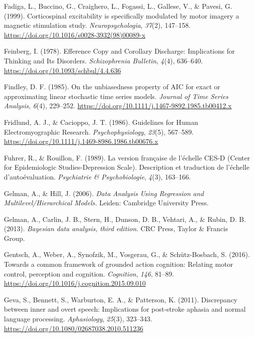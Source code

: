 \documentclass[a4paper,12pt,twoside,openright,oldfontcommands]{memoir}
\begin{document}
\hypertarget{ref-fadiga_corticospinal_1999}{}
Fadiga, L., Buccino, G., Craighero, L., Fogassi, L., Gallese, V., \&
Pavesi, G. (1999). Corticospinal excitability is specifically modulated
by motor imagery a magnetic stimulation study. \emph{Neuropsychologia},
\emph{37}(2), 147--158.
\url{https://doi.org/10.1016/s0028-3932(98)00089-x}

\hypertarget{ref-feinberg_efference_1978}{}
Feinberg, I. (1978). Efference Copy and Corollary Discharge:
Implications for Thinking and Its Disorders. \emph{Schizophrenia
Bulletin}, \emph{4}(4), 636--640.
\url{https://doi.org/10.1093/schbul/4.4.636}

\hypertarget{ref-findley_unbiasedness_1985}{}
Findley, D. F. (1985). On the unbiasedness property of AIC for exact or
approximating linear stochastic time series models. \emph{Journal of
Time Series Analysis}, \emph{6}(4), 229--252.
\url{https://doi.org/10.1111/j.1467-9892.1985.tb00412.x}

\hypertarget{ref-fridlund_guidelines_1986}{}
Fridlund, A. J., \& Cacioppo, J. T. (1986). Guidelines for Human
Electromyographic Research. \emph{Psychophysiology}, \emph{23}(5),
567--589. \url{https://doi.org/10.1111/j.1469-8986.1986.tb00676.x}

\hypertarget{ref-fuhrer_version_1989}{}
Fuhrer, R., \& Rouillon, F. (1989). La version française de l'échelle
CES-D (Center for Epidemiologic Studies-Depression Scale). Description
et traduction de l'échelle d'autoévaluation. \emph{Psychiatrie \&
Psychobiologie}, \emph{4}(3), 163--166.

\hypertarget{ref-gelman_data_2006}{}
Gelman, A., \& Hill, J. (2006). \emph{Data Analysis Using Regression and
Multilevel/Hierarchical Models.} Leiden: Cambridge University Press.

\hypertarget{ref-gelman_bayesian_2013}{}
Gelman, A., Carlin, J. B., Stern, H., Dunson, D. B., Vehtari, A., \&
Rubin, D. B. (2013). \emph{Bayesian data analysis, third edition}. CRC
Press, Taylor \& Francis Group.

\hypertarget{ref-gentsch_towards_2016}{}
Gentsch, A., Weber, A., Synofzik, M., Vosgerau, G., \& Schütz-Bosbach,
S. (2016). Towards a common framework of grounded action cognition:
Relating motor control, perception and cognition. \emph{Cognition},
\emph{146}, 81--89.
\url{https://doi.org/10.1016/j.cognition.2015.09.010}

\hypertarget{ref-geva_discrepancy_2011}{}
Geva, S., Bennett, S., Warburton, E. A., \& Patterson, K. (2011).
Discrepancy between inner and overt speech: Implications for post-stroke
aphasia and normal language processing. \emph{Aphasiology},
\emph{25}(3), 323--343.
\url{https://doi.org/10.1080/02687038.2010.511236}
\end{document}
